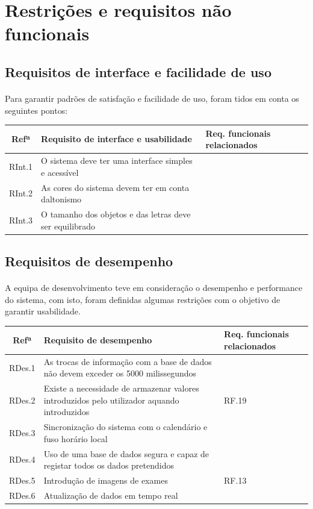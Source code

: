 \documentclass[11pt,a4paper,twoside]{report}
\begin{document}
\section{Restrições e requisitos não funcionais }

\subsection{Requisitos de interface e facilidade de uso}

\paragraph{}

Para garantir padrões de satisfação e facilidade de uso, foram tidos em conta os seguintes pontos:

\begin{tabularx}{\textwidth}{|c|X|p{}|}
	\hline
\textbf{Refª} 	& \textbf{Requisito de interface e usabilidade}  & \textbf{Req. funcionais relacionados}  \\
	\hline
RInt.1 	& O sistema deve ter uma interface simples e acessível   &  \\
	\hline
RInt.2	& As cores do sistema devem ter em conta daltonismo  &  \\
	\hline
RInt.3	& O tamanho dos objetos e das letras deve ser equilibrado   &  \\
	\hline
\end{tabularx}

\subsection{Requisitos de desempenho  }

\paragraph{}

A equipa de desenvolvimento teve em consideração o desempenho e performance do sistema, com isto, foram definidas algumas restrições com o objetivo de garantir usabilidade.

\begin{tabularx}{\textwidth}{|c|X|p{}|}
	\hline
	\textbf{Refª} 	& \textbf{Requisito de desempenho }  & \textbf{Req. funcionais relacionados}  \\
	\hline
	RDes.1 	& As trocas de informação com a base de dados não devem exceder os 5000 milissegundos    &  \\
	\hline
	RDes.2	& Existe a necessidade de armazenar valores introduzidos pelo utilizador aquando introduzidos   & RF.19 \\
	\hline
	RDes.3	& Sincronização do sistema com o calendário e fuso horário local    &  \\
	\hline
	RDes.4	& Uso de uma base de dados segura e capaz de registar todos os dados pretendidos      &  \\
	\hline
	RDes.5	& Introdução de imagens de exames       & RF.13  \\
	\hline
	RDes.6	& Atualização de dados em tempo real	& \\
	\hline
\end{tabularx}
\end{document}
